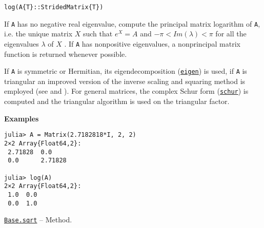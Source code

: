 \begin{adjustwidth}{2em}{0pt}


\begin{verbatim}
log(A{T}::StridedMatrix{T})
\end{verbatim}

If \texttt{A} has no negative real eigenvalue, compute the principal matrix logarithm of \texttt{A}, i.e. the unique matrix  \(X\)  such that  \(e^X = A\)  and  \(-\pi < Im(\lambda) < \pi\)  for all the eigenvalues  \(\lambda\)  of  \(X\) . If \texttt{A} has nonpositive eigenvalues, a nonprincipal matrix function is returned whenever possible.

If \texttt{A} is symmetric or Hermitian, its eigendecomposition (\hyperlink{11056016707394839114}{\texttt{eigen}}) is used, if \texttt{A} is triangular an improved version of the inverse scaling and squaring method is employed (see \footnotemark[9] and \footnotemark[10]). For general matrices, the complex Schur form (\hyperlink{17132870828407138368}{\texttt{schur}}) is computed and the triangular algorithm is used on the triangular factor.

\textbf{Examples}


\begin{verbatim}
julia> A = Matrix(2.7182818*I, 2, 2)
2×2 Array{Float64,2}:
 2.71828  0.0
 0.0      2.71828

julia> log(A)
2×2 Array{Float64,2}:
 1.0  0.0
 0.0  1.0
\end{verbatim}



\end{adjustwidth}
\hypertarget{2764611134083270926}{} 
\hyperlink{2764611134083270926}{\texttt{Base.sqrt}}  -- {Method.}

